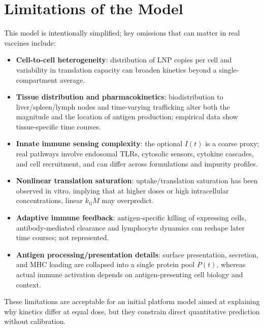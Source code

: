 \section{Limitations of the Model}

This model is intentionally simplified; key omissions that can matter in real vaccines include:
\begin{itemize}
    \item \textbf{Cell-to-cell heterogeneity}: distribution of LNP copies per cell and variability in translation capacity can broaden kinetics beyond a single-compartment average. \parencite{pardi2015expressionKinetics}
    \item \textbf{Tissue distribution and pharmacokinetics}: biodistribution to liver/spleen/lymph nodes and time-varying trafficking alter both the magnitude and the location of antigen production; empirical data show tissue-specific time courses. \parencite{Hassett2024mRNAVaccineTrafficking}
    \item \textbf{Innate immune sensing complexity}: the optional $I(t)$ is a coarse proxy; real pathways involve endosomal TLRs, cytosolic sensors, cytokine cascades, and cell recruitment, and can differ across formulations and impurity profiles. \parencite{Nelson2020mRNAChemistryInnateImmunity}
    \item \textbf{Nonlinear translation saturation}: uptake/translation saturation has been observed in vitro, implying that at higher doses or high intracellular concentrations, linear $k_{\mathrm{tl}}M$ may overpredict. \parencite{pardi2015expressionKinetics}
    \item \textbf{Adaptive immune feedback}: antigen-specific killing of expressing cells, antibody-mediated clearance and lymphocyte dynamics can reshape later time courses; not represented.
    \item \textbf{Antigen processing/presentation details}: surface presentation, secretion, and MHC loading are collapsed into a single protein pool $P(t)$, whereas actual immune activation depends on antigen-presenting cell biology and context.
\end{itemize}

These limitations are acceptable for an initial platform model aimed at explaining why kinetics differ at equal dose, but they constrain direct quantitative prediction without calibration.
